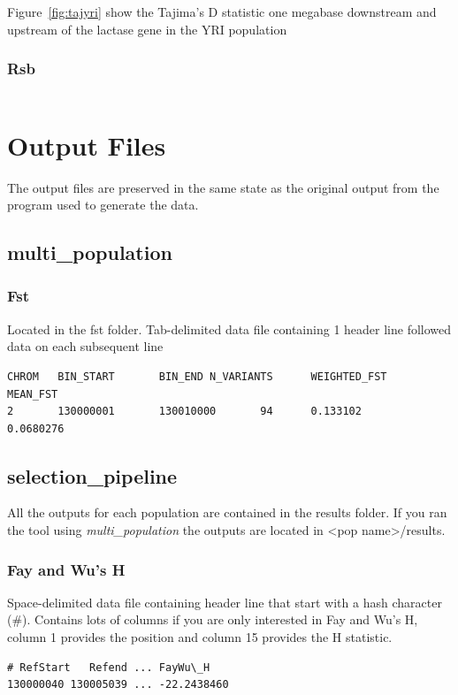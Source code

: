 \documentclass[a4paper,10pt]{article}
\begin{document}
Figure~\ref{fig:tajyri} show the Tajima's D statistic one megabase downstream and upstream of the lactase gene in the YRI population

\subsubsection{Rsb}
\begin{verbatim}
\end{verbatim}
\section{Output Files}
The output files are preserved in the same state as the original output from the program used to generate the data.
\subsection{multi\_population}
\subsubsection{Fst}
Located in the fst folder. Tab-delimited data file containing 1 header line followed data on each subsequent line\\
\begin{verbatim}
CHROM   BIN_START       BIN_END N_VARIANTS      WEIGHTED_FST    MEAN_FST  
2       130000001       130010000       94      0.133102        0.0680276 
\end{verbatim}
\subsection{selection\_pipeline}
All the outputs for each population are contained in the results folder. If you ran the tool using \emph{multi\_population} the outputs are located in <pop name>/results. 
\subsubsection{Fay and Wu's H}
Space-delimited data file containing header line that start with a hash character (\#). Contains lots of columns if you are only interested in Fay and Wu's H, column 1 provides the position and column 15 provides the H statistic. \\
\begin{verbatim}
# RefStart   Refend ... FayWu\_H
130000040 130005039 ... -22.2438460
\end{verbatim}
\end{document}
